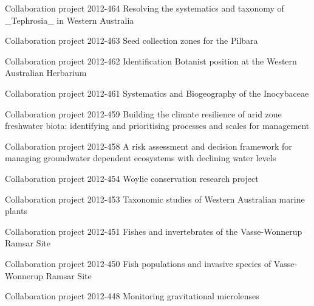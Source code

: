 \documentclass[version=last, paper=a4, DIV=18, usenames, dvipsnames]{scrartcl}
\begin{document}
\begin{longtabu}
  Collaboration project 2012-464 Resolving the systematics and taxonomy of \_Tephrosia\_ in Western Australia \newline  \\ \hline

  Collaboration project 2012-463 Seed collection zones for the Pilbara \newline  \\ \hline

  Collaboration project 2012-462 Identification Botanist position at the Western Australian Herbarium \newline  \\ \hline

  Collaboration project 2012-461 Systematics and Biogeography of the Inocybaceae \newline  \\ \hline

  Collaboration project 2012-459 Building the climate resilience of arid zone freshwater biota: identifying and prioritising processes and scales for management \newline  \\ \hline

  Collaboration project 2012-458 A risk assessment and decision framework for managing groundwater dependent ecosystems with declining water levels \newline  \\ \hline

  Collaboration project 2012-454 Woylie conservation research project \newline  \\ \hline

  Collaboration project 2012-453 Taxonomic studies of Western Australian marine plants \newline  \\ \hline

  Collaboration project 2012-451 Fishes and invertebrates of the Vasse-Wonnerup Ramsar Site \newline  \\ \hline

  Collaboration project 2012-450 Fish populations and invasive species of Vasse-Wonnerup Ramsar Site \newline  \\ \hline

  Collaboration project 2012-448 Monitoring gravitational microlenses \newline  \\ \hline


\end{longtabu}
\end{document}
